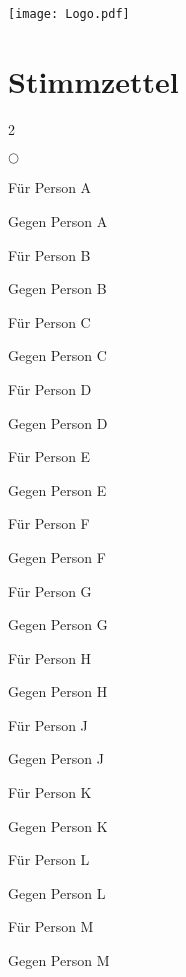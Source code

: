 \huge
\hfill
\texttt{[image: Logo.pdf]}
\vspace{-1em}
\section*{Stimmzettel}

\begin{multicols}{2}
    \begin{list}{$\bigcirc$}{}
        \item Für Person A
        \item Gegen Person A
              \setlength\itemsep{1em}
        \item Für Person B
              \setlength\itemsep{0.3em}
        \item Gegen Person B
              \setlength\itemsep{1em}
        \item Für Person C
              \setlength\itemsep{0.3em}
        \item Gegen Person C
              \setlength\itemsep{1em}
        \item Für Person D
              \setlength\itemsep{0.3em}
        \item Gegen Person D
              \setlength\itemsep{1em}
        \item Für Person E
              \setlength\itemsep{0.3em}
        \item Gegen Person E
              \setlength\itemsep{1em}
        \item Für Person F
              \setlength\itemsep{0.3em}
        \item Gegen Person F
              \setlength\itemsep{1em}
        \item Für Person G
              \setlength\itemsep{0.3em}
        \item Gegen Person G
              \setlength\itemsep{1em}
        \item Für Person H
              \setlength\itemsep{0.3em}
        \item Gegen Person H
              \setlength\itemsep{1em}
        \item Für Person J\setlength\itemsep{0.3em}
        \item Gegen Person J
              \setlength\itemsep{1em}
        \item Für Person K
              \setlength\itemsep{0.3em}
        \item Gegen Person K
              \setlength\itemsep{1em}
        \item Für Person L
              \setlength\itemsep{0.3em}
        \item Gegen Person L
              \setlength\itemsep{1em}
        \item Für Person M
              \setlength\itemsep{0.3em}
        \item Gegen Person M
    \end{list}
\end{multicols}
